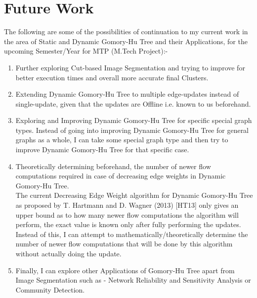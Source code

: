 \chapter{Future Work}
    The following are some of the possibilities of continuation to my current work in the area of Static and Dynamic Gomory-Hu Tree and their Applications, for the upcoming Semester/Year for MTP (M.Tech Project):-

    \vspace{5mm}
    \begin{enumerate}
        \item {
            Further exploring Cut-based Image Segmentation and trying to improve for better execution times and overall more accurate final Clusters.
        }
        \item{
            Extending Dynamic Gomory-Hu Tree to multiple edge-updates instead of single-update, given that the updates are Offline i.e. known to us beforehand.
        }
        \item {
            Exploring and Improving Dynamic Gomory-Hu Tree for specific special graph types. Instead of going into improving Dynamic Gomory-Hu Tree for general graphs as a whole, I can take some special graph type and then try to improve Dynamic Gomory-Hu Tree for that specific case.
        }
        \item {
            Theoretically determining beforehand, the number of newer flow computations required in case of decreasing edge weights in Dynamic Gomory-Hu Tree. \\
            The current Decreasing Edge Weight algorithm for Dynamic Gomory-Hu Tree as proposed by T. Hartmann and D. Wagner (2013) [HT13] only gives an upper bound as to how many newer flow computations the algorithm will perform, the exact value is known only after fully performing the updates. \\
            Instead of this, I can attempt to mathematically/theoretically determine the number of newer flow computations that will be done by this algorithm without actually doing the update.
        }
        \item {
            Finally, I can explore other Applications of Gomory-Hu Tree apart from Image Segmentation such as - Network Reliability and Sensitivity Analysis or Community Detection.
        }
    \end{enumerate}